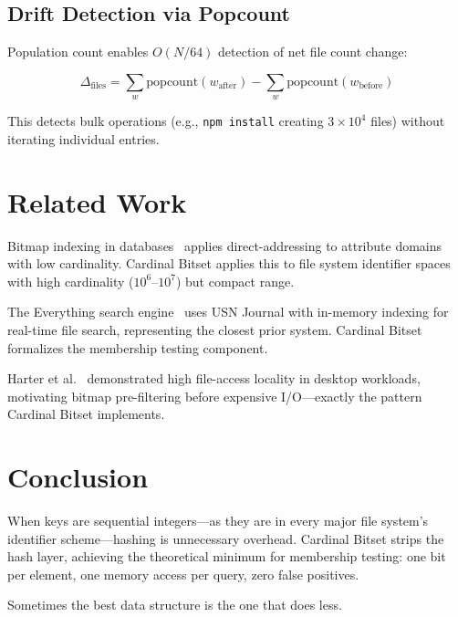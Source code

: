 \documentclass[11pt,twocolumn]{article}
\begin{document}
\subsection{Drift Detection via Popcount}

Population count enables $O(N/64)$ detection of net file count change:

\begin{equation}
\Delta_{\text{files}} = \sum_w \text{popcount}(w_{\text{after}}) - \sum_w \text{popcount}(w_{\text{before}})
\end{equation}

This detects bulk operations (e.g., \texttt{npm install} creating $3 \times 10^4$ files) without iterating individual entries.

\section{Related Work}

Bitmap indexing in databases~\cite{oneil1997} applies direct-addressing to attribute domains with low cardinality. Cardinal Bitset applies this to file system identifier spaces with high cardinality ($10^6$--$10^7$) but compact range.

The Everything search engine~\cite{voidtools2023} uses USN Journal with in-memory indexing for real-time file search, representing the closest prior system. Cardinal Bitset formalizes the membership testing component.

Harter et al.~\cite{harter2011} demonstrated high file-access locality in desktop workloads, motivating bitmap pre-filtering before expensive I/O---exactly the pattern Cardinal Bitset implements.

\section{Conclusion}

When keys are sequential integers---as they are in every major file system's identifier scheme---hashing is unnecessary overhead. Cardinal Bitset strips the hash layer, achieving the theoretical minimum for membership testing: one bit per element, one memory access per query, zero false positives.

Sometimes the best data structure is the one that does less.
\end{document}
